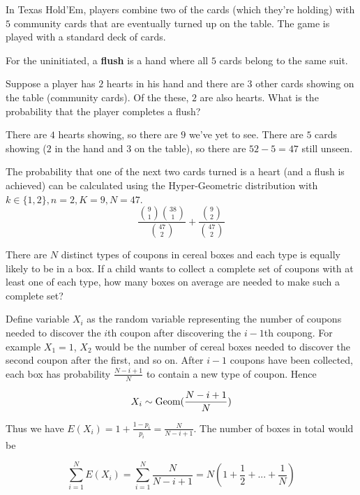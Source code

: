 \documentclass[11pt]{article}
\begin{document}
\begin{exercise}
In Texas Hold'Em, players combine two of the cards (which they're holding) with $5$ community cards that are eventually turned up on the table. The game is played with a standard deck of cards.

For the uninitiated, a \textbf{flush} is a hand where all $5$ cards belong to the same suit.

Suppose a player has $2$ hearts in his hand and there are $3$ other cards showing on the table (community cards). Of the these, $2$ are also hearts. What is the probability that the player completes a flush?

\end{exercise}
\begin{solution}
There are $4$ hearts showing, so there are $9$ we've yet to see. There are $5$ cards showing ($2$ in the hand and $3$ on the table), so there are $52-5 = 47$ still unseen.

The probability that one of the next two cards turned is a heart (and a flush is achieved) can be calculated using the Hyper-Geometric distribution with $k \in \{1,2\}, n = 2, K = 9, N = 47$.
$$
\frac{{9 \choose 1}{38 \choose 1}}{{47 \choose 2}} + \frac{{9 \choose 2}}{{47 \choose 2}}
$$
\end{solution}


\begin{exercise}
There are $N$ distinct types of coupons in cereal boxes and each type is equally likely to be in a box. If a child wants to collect a complete set of coupons with at least one of each type, how many boxes on average are needed to make such a complete set?
\end{exercise}
\begin{solution}
Define variable $X_i$ as the random variable representing the number of coupons needed to discover the $i$th coupon after discovering the $i-1$th coupong. For example $X_1 = 1$, $X_2$ would be the number of cereal boxes needed to discover the second coupon after the first, and so on. After $i-1$ coupons have been collected, each box has probability $\frac{N-i+1}{N}$ to contain a new type of coupon. Hence

$$X_i \sim \textrm{Geom}(\frac{N-i+1}{N})$$

Thus we have $E(X_i) = 1 + \frac{1-p_i}{p_i} = \frac{N}{N-i+1}$. The number of boxes in total would be

$$\sum_{i=1}^N E(X_i) = \sum_{i=1}^N \frac{N}{N-i+1} = N(1+\frac{1}{2} + ... + \frac{1}{N})$$
\end{solution}
\end{document}
